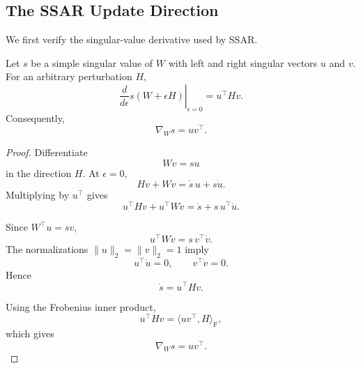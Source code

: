 \subsection{The SSAR Update Direction}

We first verify the singular-value derivative used by SSAR.

\begin{lemma}
\label{lem:singular_derivative}
Let $s$ be a simple singular value of $W$ with left and right singular vectors
$u$ and $v$. For an arbitrary perturbation $H$,
\begin{equation}
\left.
\frac{d}{d\epsilon}
s(W+\epsilon H)
\right|_{\epsilon=0}
=
u^\top Hv.
\end{equation}
Consequently,
\begin{equation}
\nabla_Ws
=
uv^\top.
\end{equation}
\end{lemma}

\begin{proof}
Differentiate
\begin{equation}
Wv=su
\end{equation}
in the direction $H$. At $\epsilon=0$,
\begin{equation}
Hv+W\dot v
=
\dot s\,u+s\dot u.
\end{equation}
Multiplying by $u^\top$ gives
\begin{equation}
u^\top Hv
+
u^\top W\dot v
=
\dot s
+
s\,u^\top\dot u.
\end{equation}

Since $W^\top u=sv$,
\begin{equation}
u^\top W\dot v
=
s\,v^\top\dot v.
\end{equation}
The normalizations $\|u\|_2=\|v\|_2=1$ imply
\begin{equation}
u^\top\dot u=0,
\qquad
v^\top\dot v=0.
\end{equation}
Hence
\begin{equation}
\dot s=u^\top Hv.
\end{equation}

Using the Frobenius inner product,
\begin{equation}
u^\top Hv
=
\langle uv^\top,H\rangle_{\mathrm F},
\end{equation}
which gives
\begin{equation}
\nabla_Ws=uv^\top.
\end{equation}
\end{proof}


